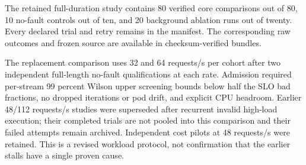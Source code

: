 The retained full-duration study contains 80 verified core comparisons out of 80, 10 no-fault controls out of ten, and 20 background ablation runs out of twenty. Every declared trial and retry remains in the manifest. The corresponding raw outcomes and frozen source are available in checksum-verified bundles.

The replacement comparison uses 32 and 64 requests/s per cohort after two independent full-length no-fault qualifications at each rate. Admission required per-stream 99 percent Wilson upper screening bounds below half the SLO bad fractions, no dropped iterations or pod drift, and explicit CPU headroom. Earlier 48/112 requests/s studies were superseded after recurrent invalid high-load execution; their completed trials are not pooled into this comparison and their failed attempts remain archived. Independent cost pilots at 48 requests/s were retained. This is a revised workload protocol, not confirmation that the earlier stalls have a single proven cause.

